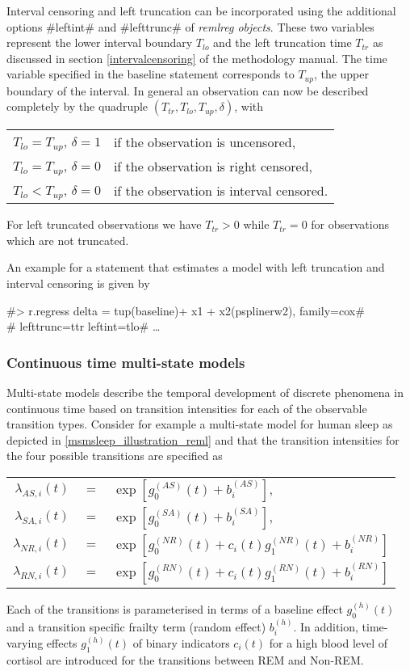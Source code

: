 Interval censoring and left truncation can be incorporated using the
additional options #leftint# and #lefttrunc# of {\em remlreg
objects}. These two variables represent the lower interval boundary
$T_{lo}$ and the left truncation time $T_{tr}$ as discussed in
section \ref*{intervalcensoring} of the methodology manual. The time
variable specified in the baseline statement corresponds to
$T_{up}$, the upper boundary of the interval. In general an
observation can now be described completely by the quadruple
$(T_{tr},T_{lo},T_{up},\delta)$, with
\begin{center}
\begin{tabular}{ll}
$T_{lo}=T_{up}$, $\delta=1$ & if the observation is uncensored,\\
$T_{lo}=T_{up}$, $\delta=0$ & if the observation is right censored,\\
$T_{lo}<T_{up}$, $\delta=0$ & if the observation is interval censored.\\
\end{tabular}
\end{center}
For left truncated observations we have $T_{tr}>0$ while $T_{tr}=0$
for observations which are not truncated.

An example for a statement that estimates a model with left
truncation and interval censoring is given by

 #> r.regress delta = tup(baseline)+ x1 + x2(psplinerw2), family=cox#\\
 #  lefttrunc=ttr leftint=tlo# \ldots

\subsubsection*{Continuous time multi-state
models}

Multi-state models describe the temporal development of discrete
phenomena in continuous time based on transition intensities for
each of the observable transition types. Consider for example a
multi-state model for human sleep as depicted in
\autoref{msmsleep_illustration_reml} and that the transition
intensities for the four possible transitions are specified as
\begin{center}
\begin{tabular}{rcl}
 $\lambda_{AS,i}(t)$ & $=$ & $\exp\left[g_0^{(AS)}(t) + b_i^{(AS)}\right],$\\[2mm]
 $\lambda_{SA,i}(t)$ & $=$ & $\exp\left[g_0^{(SA)}(t) + b_i^{(SA)}\right],$\\[2mm]
 $\lambda_{NR,i}(t)$ & $=$ & $\exp\left[g_0^{(NR)}(t) + c_i(t)g_1^{(NR)}(t) + b_i^{(NR)}\right]$\\[2mm]
 $\lambda_{RN,i}(t)$ & $=$ & $\exp\left[g_0^{(RN)}(t) + c_i(t)g_1^{(RN)}(t) + b_i^{(RN)}\right]$
\end{tabular}
\end{center}
Each of the transitions is parameterised in terms of a baseline
effect $g_0^{(h)}(t)$ and a transition specific frailty term (random
effect) $b_i^{(h)}$. In addition, time-varying effects
$g_1^{(h)}(t)$ of binary indicators $c_i(t)$ for a high blood level
of cortisol are introduced for the transitions between REM and
Non-REM.

